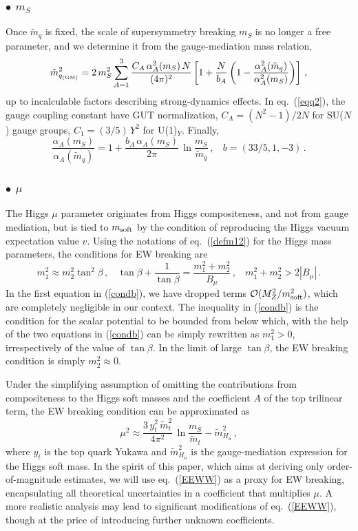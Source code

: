 \documentclass[a4paper,12pt]{article}
\newcommand{\beq}{\begin{equation}}
\newcommand{\eeq}{\end{equation}}
\def\eq#1{eq.~(\ref{#1})}
\def\eq#1{eq.~(\ref{#1})}
\def\O{\mathcal{O}}
\def\mS{m_S}
\def\msoft{m_{\rm soft}}
\begin{document}
 \boldmath
\subsubsection*{$\bullet$ $\mS$}
\unboldmath

Once ${\tilde m}_q$ is fixed, the scale of supersymmetry breaking $\mS$ is no longer a free parameter, and we determine it from the gauge-mediation mass relation,
\beq
{\tilde m}_{ q_{\rm (GM)}}^{2} = 2\,\mS^2\sum_{A=1}^3 \frac{C_A \,\alpha_A^2(m_S)\, N}{(4\pi)^2}\left[ 1+\frac{N}{b_A}\left( 1-\frac{\alpha_A^2({\tilde m}_q)}{\alpha_A^2(\mS)}\right)\right] \, ,
\label{eqq2}
\eeq
up to incalculable factors describing strong-dynamics effects. In \eq{eqq2}, the gauge coupling constant have GUT normalization, $C_A=(N^2-1)/2N$ for SU($N$) gauge groups, $C_1=(3/5)\,Y^2$ for U(1)$_Y$. Finally,
\beq
\frac{\alpha_A(\mS)}{\alpha_A({\tilde m}_q)}=1+\frac{b_A\,\alpha_A(\mS)}{2\pi}\, \ln \frac{\mS}{{\tilde m}_q}\, ,~~~~b=(33/5,1,-3) \, .
\label{betafun}
\eeq

 \boldmath
\subsubsection*{$\bullet$ $\mu$}
\unboldmath

The Higgs $\mu$ parameter originates from Higgs compositeness, and not from gauge mediation, but is tied to $\msoft$ by the condition of reproducing the Higgs vacuum expectation value $v$. Using the notations of \eq{defm12} for the Higgs mass parameters, the conditions for EW breaking are
\beq
m_1^2 \approx m_2^2 \tan^2\beta \, ,~~~~
\tan\beta + \frac{1}{\tan\beta} = \frac{m_1^2+m_2^2}{B_\mu}\, ,~~~~
m_1^2 + m_2^2 > 2|B_\mu | \, .
\label{condb}
\eeq
In the first equation in (\ref{condb}), we have dropped terms $\O (M_Z^2/\msoft^2)$, which are completely negligible in our context. The inequality in (\ref{condb}) is the condition for the scalar potential to be bounded from below which, with the help of the two equations in (\ref{condb}) can be simply rewritten as $m_1^2 >0$, irrespectively of the value of $\tan\beta$. In the limit of large $\tan\beta$, the EW breaking condition is simply $m_2^2\approx 0$.

Under the simplifying assumption of omitting the contributions from compositeness to the Higgs soft masses and the coefficient $A$ of the top trilinear term, the EW breaking condition can be approximated as
\beq
\mu^2 \approx \frac{3 \,y_t^2\, {\tilde m}_t^2}{4\pi^2}\,\ln \frac{\mS}{{\tilde m}_t} 
-{\tilde m}^2_{H_u}
\, ,
\label{EEWW}
\eeq
where $y_t$ is the top quark Yukawa and ${\tilde m}^2_{H_u}$ is the gauge-mediation expression for the Higgs soft mass. In the spirit of this paper, which aims at deriving only order-of-magnitude estimates, we will use \eq{EEWW} as a proxy for EW breaking, encapsulating all theoretical uncertainties in a coefficient that multiplies $\mu$. A more realistic analysis may lead to significant modifications of \eq{EEWW}, though at the price of introducing further unknown coefficients.
\end{document}
